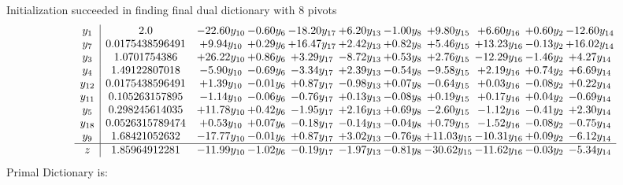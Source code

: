 \documentclass[9pt]{article}
\begin{document}
Initialization succeeded in finding final dual dictionary with 8 pivots
\[\begin{array}{c| c c@{\hskip 2pt} c@{\hskip 2pt} c@{\hskip 2pt} c@{\hskip 2pt} c@{\hskip 2pt} c@{\hskip 2pt} c@{\hskip 2pt} c@{\hskip 2pt} c@{\hskip 2pt} }
 y_{1}   &  2.0 & -22.60 y_{10} & -0.60 y_{6} & -18.20 y_{17} & +  6.20 y_{13} & -1.00 y_{8} & +  9.80 y_{15} & +  6.60 y_{16} & +  0.60 y_{2} & -12.60 y_{14}\\
 y_{7}   &  0.0175438596491 & +  9.94 y_{10} & +  0.29 y_{6} & + 16.47 y_{17} & +  2.42 y_{13} & +  0.82 y_{8} & +  5.46 y_{15} & + 13.23 y_{16} & -0.13 y_{2} & + 16.02 y_{14}\\
 y_{3}   &  1.0701754386 & + 26.22 y_{10} & +  0.86 y_{6} & +  3.29 y_{17} & -8.72 y_{13} & +  0.53 y_{8} & +  2.76 y_{15} & -12.29 y_{16} & -1.46 y_{2} & +  4.27 y_{14}\\
 y_{4}   &  1.49122807018 & -5.90 y_{10} & -0.69 y_{6} & -3.34 y_{17} & +  2.39 y_{13} & -0.54 y_{8} & -9.58 y_{15} & +  2.19 y_{16} & +  0.74 y_{2} & +  6.69 y_{14}\\
 y_{12}   &  0.0175438596491 & +  1.39 y_{10} & -0.01 y_{6} & +  0.87 y_{17} & -0.98 y_{13} & +  0.07 y_{8} & -0.64 y_{15} & +  0.03 y_{16} & -0.08 y_{2} & +  0.22 y_{14}\\
 y_{11}   &  0.105263157895 & -1.14 y_{10} & -0.06 y_{6} & -0.76 y_{17} & +  0.13 y_{13} & -0.08 y_{8} & +  0.19 y_{15} & +  0.17 y_{16} & +  0.04 y_{2} & -0.69 y_{14}\\
 y_{5}   &  0.298245614035 & + 11.78 y_{10} & +  0.42 y_{6} & -1.95 y_{17} & +  2.16 y_{13} & +  0.69 y_{8} & -2.60 y_{15} & -1.12 y_{16} & -0.41 y_{2} & +  2.30 y_{14}\\
 y_{18}   &  0.0526315789474 & +  0.53 y_{10} & +  0.07 y_{6} & -0.18 y_{17} & -0.14 y_{13} & -0.04 y_{8} & +  0.79 y_{15} & -1.52 y_{16} & -0.08 y_{2} & -0.75 y_{14}\\
 y_{9}   &  1.68421052632 & -17.77 y_{10} & -0.01 y_{6} & +  0.87 y_{17} & +  3.02 y_{13} & -0.76 y_{8} & + 11.03 y_{15} & -10.31 y_{16} & +  0.09 y_{2} & -6.12 y_{14}\\
\hline
z    &  1.85964912281 & -11.99 y_{10} & -1.02 y_{6} & -0.19 y_{17} & -1.97 y_{13} & -0.81 y_{8} & -30.62 y_{15} & -11.62 y_{16} & -0.03 y_{2} & -5.34 y_{14}\\
\end{array}\]
Primal Dictionary is:
\end{document}
